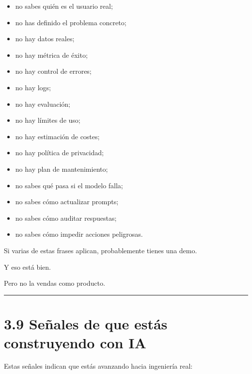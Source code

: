 \begin{itemize}
\tightlist
\item
  no sabes quién es el usuario real;
\item
  no has definido el problema concreto;
\item
  no hay datos reales;
\item
  no hay métrica de éxito;
\item
  no hay control de errores;
\item
  no hay logs;
\item
  no hay evaluación;
\item
  no hay límites de uso;
\item
  no hay estimación de costes;
\item
  no hay política de privacidad;
\item
  no hay plan de mantenimiento;
\item
  no sabes qué pasa si el modelo falla;
\item
  no sabes cómo actualizar prompts;
\item
  no sabes cómo auditar respuestas;
\item
  no sabes cómo impedir acciones peligrosas.
\end{itemize}

Si varias de estas frases aplican, probablemente tienes una demo.

Y eso está bien.

Pero no la vendas como producto.

\begin{center}\rule{0.5\linewidth}{0.5pt}\end{center}

\section{3.9 Señales de que estás construyendo con
IA}\label{seuxf1ales-de-que-estuxe1s-construyendo-con-ia}

Estas señales indican que estás avanzando hacia ingeniería real:

